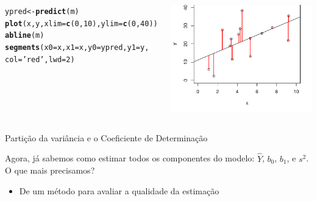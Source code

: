 \documentclass{beamer}\usepackage[]{graphicx}\usepackage[]{color}
\makeatletter
\newcommand{\hlnum}[1]{\textcolor[rgb]{0.686,0.059,0.569}{#1}}%
\newcommand{\hlstr}[1]{\textcolor[rgb]{0.192,0.494,0.8}{#1}}%
\newcommand{\hlstd}[1]{\textcolor[rgb]{0.345,0.345,0.345}{#1}}%
\newcommand{\hlkwb}[1]{\textcolor[rgb]{0.69,0.353,0.396}{#1}}%
\newcommand{\hlkwc}[1]{\textcolor[rgb]{0.333,0.667,0.333}{#1}}%
\newcommand{\hlkwd}[1]{\textcolor[rgb]{0.737,0.353,0.396}{\textbf{#1}}}%
\newenvironment{kframe}{%
 \def\at@end@of@kframe{}%
 \ifinner\ifhmode%
  \def\at@end@of@kframe{\end{minipage}}%
  \begin{minipage}{\columnwidth}%
 \fi\fi%
 \def\FrameCommand##1{\hskip\@totalleftmargin \hskip-\fboxsep
 \colorbox{shadecolor}{##1}\hskip-\fboxsep
     \hskip-\linewidth \hskip-\@totalleftmargin \hskip\columnwidth}%
 \MakeFramed {\advance\hsize-\width
   \@totalleftmargin\z@ \linewidth\hsize
   \@setminipage}}%
 {\par\unskip\endMakeFramed%
 \at@end@of@kframe}
\newenvironment{knitrout}{}{} %
\renewenvironment{knitrout}{\setlength{\topsep}{0mm}}{}
\makeatother
\begin{document}
\begin{frame}[fragile]
\begin{columns}[t]
\begin{knitrout}\tiny
{}\color{fgcolor}\begin{kframe}
\begin{alltt}
\hlstd{ypred} \hlkwb{<-} \hlkwd{predict}\hlstd{(m)}
\hlkwd{plot}\hlstd{(x,y,}\hlkwc{xlim}\hlstd{=}\hlkwd{c}\hlstd{(}\hlnum{0}\hlstd{,}\hlnum{10}\hlstd{),}\hlkwc{ylim}\hlstd{=}\hlkwd{c}\hlstd{(}\hlnum{0}\hlstd{,}\hlnum{40}\hlstd{))}
\hlkwd{abline}\hlstd{(m)}
\hlkwd{segments}\hlstd{(}\hlkwc{x0}\hlstd{=x,} \hlkwc{x1}\hlstd{=x,}\hlkwc{y0}\hlstd{=ypred,}\hlkwc{y1}\hlstd{=y,}
         \hlkwc{col}\hlstd{=}\hlstr{'red'}\hlstd{,}\hlkwc{lwd}\hlstd{=}\hlnum{2}\hlstd{)}
\end{alltt}
\end{kframe}
\includegraphics[width=1\linewidth]{figure/esd10plot-1} 

\end{knitrout}

\end{columns}

\end{frame}

\begin{frame}{Partição da variância e o Coeficiente de Determinação}

Agora, já sabemos como estimar todos os componentes do modelo:  $\hat Y$, $b_0$, $b_1$, e $s^2$. O que mais precisamos? \pause
\vfill
\begin{itemize}
  \item De um método para avaliar a qualidade da estimação \pause
  \vfill
  \end{itemize}

\end{frame}
\end{document}
